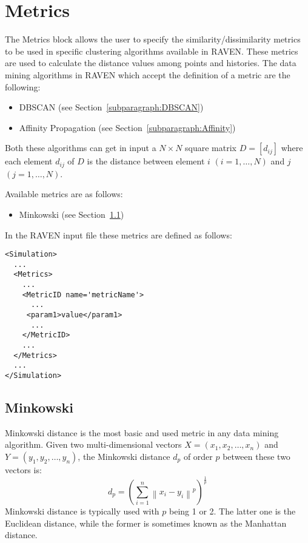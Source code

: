 \section{Metrics}
\label{sec:Metrics}

The Metrics block allows the user to specify the similarity/dissimilarity metrics to be used in specific clustering algorithms available in RAVEN.
These metrics are used to calculate the distance values among points and histories.
The data mining algorithms in RAVEN which accept the definition of a metric are the following:
\begin{itemize}
  \item DBSCAN (see Section~\ref{subparagraph:DBSCAN})
  \item Affinity Propagation (see Section~\ref{subparagraph:Affinity})
\end{itemize}
Both these algorithms can get in input a $N \times N$ square matrix $D=[d_{ij}]$ where each element $d_{ij}$ of $D$ is the distance between element $i$ $(i=1,\ldots,N)$ and $j$ $(j=1,\ldots,N)$.

Available metrics are as follows:
\begin{itemize}
  \item Minkowski (see Section~\ref{subsection:Minkowski})
\end{itemize}

In the RAVEN input file these metrics are defined as follows:
\begin{lstlisting}[style=XML]
<Simulation>
  ...
  <Metrics>
    ...
    <MetricID name='metricName'>
      ...
     <param1>value</param1>
      ...
    </MetricID>
    ...
  </Metrics>
  ...
</Simulation>
\end{lstlisting}

\subsection{Minkowski}
\label{subsection:Minkowski}
Minkowski distance is the most basic and used metric in any data mining algorithm.
Given two multi-dimensional vectors $X=(x_1,x_2,\ldots,x_n)$ and $Y=(y_1,y_2,\ldots,y_n)$, the Minkowski distance $d_p$ of order $p$ between these two vectors is:
\begin{equation}
d_p = \left ( \sum_{i=1}^{n} \left \| x_i-y_i \right \|^p \right )^\frac{1}{p}
\end{equation}
Minkowski distance is typically used with $p$ being 1 or 2. The latter one is the Euclidean distance, while the former is sometimes known as the Manhattan distance. 

